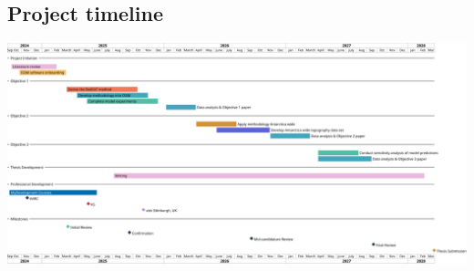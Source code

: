 \begin{landscape}
\section*{Project timeline}
    \vspace{1cm}\hspace{-2.5em}
    \includegraphics[width=0.85\linewidth]{timeline.png}
\end{landscape}